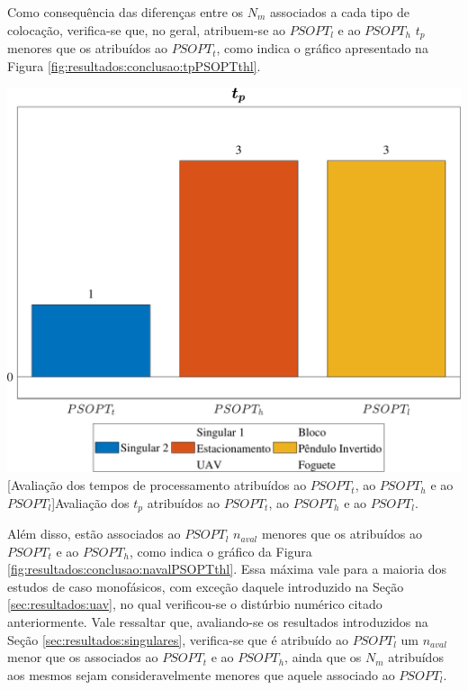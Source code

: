 Como consequência das diferenças entre os $ N_m $ associados a cada tipo de colocação, verifica-se que, no geral, atribuem-se ao $ PSOPT_l $ e ao $ PSOPT_h $ $ t_p $ menores que os atribuídos ao $ PSOPT_t $, como indica o gráfico apresentado na Figura \ref{fig:resultados:conclusao:tpPSOPTthl}. 

\noindent	
\begin{minipage}{\textwidth}
	\vspace{\onelineskip}
	\centering
	\includegraphics[width=1\linewidth]{fig/resultados/ranking/3/t}
	[Avaliação dos tempos de processamento atribuídos ao $ PSOPT_t $, ao $ PSOPT_h $ e ao $ PSOPT_l $]{Avaliação dos $ t_p $ atribuídos ao $ PSOPT_t $, ao $ PSOPT_h $ e ao $ PSOPT_l $.}
	\label{fig:resultados:conclusao:tpPSOPTthl}
	\vspace{\onelineskip}
\end{minipage}

Além disso, estão associados ao $ PSOPT_l $ $ n_{aval} $ menores que os atribuídos ao $ PSOPT_t $ e ao $ PSOPT_h $, como indica o gráfico da Figura \ref{fig:resultados:conclusao:navalPSOPTthl}. Essa máxima vale para a maioria dos estudos de caso monofásicos, com exceção daquele introduzido na Seção \ref{sec:resultados:uav}, no qual verificou-se o distúrbio numérico citado anteriormente. Vale ressaltar que, avaliando-se os resultados introduzidos na Seção \ref{sec:resultados:singulares}, verifica-se que é atribuído ao $ PSOPT_l $ um $ n_{aval} $ menor que os associados ao $ PSOPT_t $ e ao $ PSOPT_h $, ainda que os $ N_m $ atribuídos aos mesmos sejam consideravelmente menores que aquele associado ao $ PSOPT_l $.


